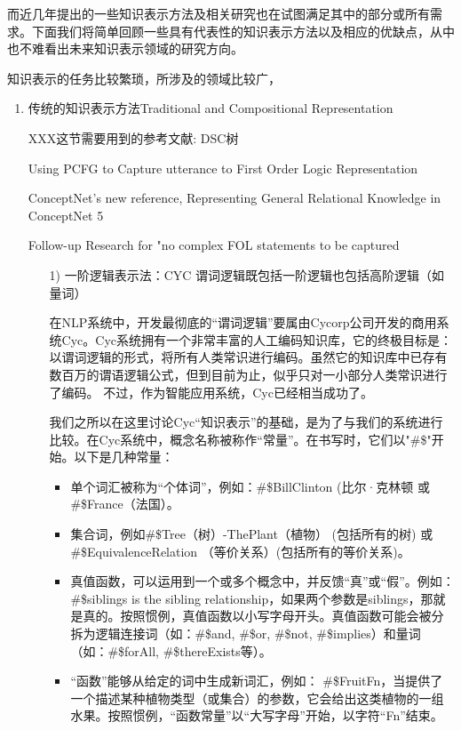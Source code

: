 而近几年提出的一些知识表示方法及相关研究也在试图满足其中的部分或所有需求。下面我们将简单回顾一些具有代表性的知识表示方法以及相应的优缺点，从中也不难看出未来知识表示领域的研究方向。

知识表示的任务比较繁琐，所涉及的领域比较广，

\begin{enumerate}
\item {传统的知识表示方法Traditional and Compositional Representation}

XXX这节需要用到的参考文献:
DSC树\cite{Liang2013}

Using PCFG to Capture utterance to First Order Logic Representation\cite{Piantadosi2008}

ConceptNet's new reference, Representing General Relational Knowledge in ConceptNet 5\cite{Robert2012}

Follow-up Research for "no complex FOL statements to be captured\cite{Titov2011}

\begin{enumerate}
\item[1)] 一阶逻辑表示法：CYC
谓词逻辑既包括一阶逻辑也包括高阶逻辑（如量词）

在NLP系统中，开发最彻底的“谓词逻辑”要属由Cycorp公司开发的商用系统Cyc\cite{Lenat1990}。Cyc系统拥有一个非常丰富的人工编码知识库，它的终极目标是：以谓词逻辑的形式，将所有人类常识进行编码。虽然它的知识库中已存有数百万的谓语逻辑公式，但到目前为止，似乎只对一小部分人类常识进行了编码。 不过，作为智能应用系统，Cyc已经相当成功了。

我们之所以在这里讨论Cyc“知识表示”的基础，是为了与我们的系统进行比较。在Cyc系统中，概念名称被称作“常量”。在书写时，它们以"\#\$"开始。以下是几种常量：

\begin{itemize}
\item 单个词汇被称为“个体词”，例如：\#\$BillClinton (比尔·克林顿 或 \#\$France（法国）。
\item 集合词，例如\#\$Tree（树）-ThePlant（植物） (包括所有的树) 或 \#\$EquivalenceRelation （等价关系）(包括所有的等价关系)。
\item 真值函数，可以运用到一个或多个概念中，并反馈“真”或“假”。例如：\#\$siblings is the sibling relationship，如果两个参数是siblings，那就是真的。按照惯例，真值函数以小写字母开头。真值函数可能会被分拆为逻辑连接词（如：\#\$and, \#\$or, \#\$not, \#\$implies）和量词（如：\#\$forAll, \#\$thereExists等）。
\item “函数”能够从给定的词中生成新词汇，例如：
\#\$FruitFn，当提供了一个描述某种植物类型（或集合）的参数，它会给出这类植物的一组水果。按照惯例，“函数常量”以“大写字母”开始，以字符“Fn”结束。
\end{itemize}


\end{enumerate}
\end{enumerate}
